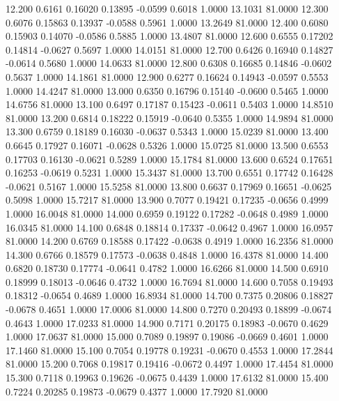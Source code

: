  12.200   0.6161   0.16020   0.13895  -0.0599   0.6018   1.0000  13.1031  81.0000
  12.300   0.6076   0.15863   0.13937  -0.0588   0.5961   1.0000  13.2649  81.0000
  12.400   0.6080   0.15903   0.14070  -0.0586   0.5885   1.0000  13.4807  81.0000
  12.600   0.6555   0.17202   0.14814  -0.0627   0.5697   1.0000  14.0151  81.0000
  12.700   0.6426   0.16940   0.14827  -0.0614   0.5680   1.0000  14.0633  81.0000
  12.800   0.6308   0.16685   0.14846  -0.0602   0.5637   1.0000  14.1861  81.0000
  12.900   0.6277   0.16624   0.14943  -0.0597   0.5553   1.0000  14.4247  81.0000
  13.000   0.6350   0.16796   0.15140  -0.0600   0.5465   1.0000  14.6756  81.0000
  13.100   0.6497   0.17187   0.15423  -0.0611   0.5403   1.0000  14.8510  81.0000
  13.200   0.6814   0.18222   0.15919  -0.0640   0.5355   1.0000  14.9894  81.0000
  13.300   0.6759   0.18189   0.16030  -0.0637   0.5343   1.0000  15.0239  81.0000
  13.400   0.6645   0.17927   0.16071  -0.0628   0.5326   1.0000  15.0725  81.0000
  13.500   0.6553   0.17703   0.16130  -0.0621   0.5289   1.0000  15.1784  81.0000
  13.600   0.6524   0.17651   0.16253  -0.0619   0.5231   1.0000  15.3437  81.0000
  13.700   0.6551   0.17742   0.16428  -0.0621   0.5167   1.0000  15.5258  81.0000
  13.800   0.6637   0.17969   0.16651  -0.0625   0.5098   1.0000  15.7217  81.0000
  13.900   0.7077   0.19421   0.17235  -0.0656   0.4999   1.0000  16.0048  81.0000
  14.000   0.6959   0.19122   0.17282  -0.0648   0.4989   1.0000  16.0345  81.0000
  14.100   0.6848   0.18814   0.17337  -0.0642   0.4967   1.0000  16.0957  81.0000
  14.200   0.6769   0.18588   0.17422  -0.0638   0.4919   1.0000  16.2356  81.0000
  14.300   0.6766   0.18579   0.17573  -0.0638   0.4848   1.0000  16.4378  81.0000
  14.400   0.6820   0.18730   0.17774  -0.0641   0.4782   1.0000  16.6266  81.0000
  14.500   0.6910   0.18999   0.18013  -0.0646   0.4732   1.0000  16.7694  81.0000
  14.600   0.7058   0.19493   0.18312  -0.0654   0.4689   1.0000  16.8934  81.0000
  14.700   0.7375   0.20806   0.18827  -0.0678   0.4651   1.0000  17.0006  81.0000
  14.800   0.7270   0.20493   0.18899  -0.0674   0.4643   1.0000  17.0233  81.0000
  14.900   0.7171   0.20175   0.18983  -0.0670   0.4629   1.0000  17.0637  81.0000
  15.000   0.7089   0.19897   0.19086  -0.0669   0.4601   1.0000  17.1460  81.0000
  15.100   0.7054   0.19778   0.19231  -0.0670   0.4553   1.0000  17.2844  81.0000
  15.200   0.7068   0.19817   0.19416  -0.0672   0.4497   1.0000  17.4454  81.0000
  15.300   0.7118   0.19963   0.19626  -0.0675   0.4439   1.0000  17.6132  81.0000
  15.400   0.7224   0.20285   0.19873  -0.0679   0.4377   1.0000  17.7920  81.0000

